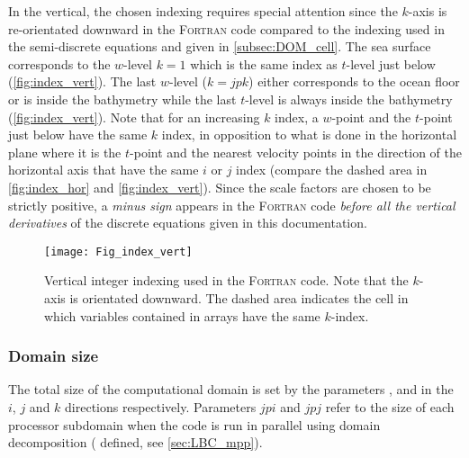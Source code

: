 \documentclass[../tex_main/NEMO_manual]{subfiles}
\begin{document}
In the vertical, the chosen indexing requires special attention since the 
$k$-axis is re-orientated downward in the \textsc{Fortran} code compared 
to the indexing used in the semi-discrete equations and given in \autoref{subsec:DOM_cell}. 
The sea surface corresponds to the $w$-level $k=1$ which is the same index 
as $t$-level just below (\autoref{fig:index_vert}). The last $w$-level ($k=jpk$) 
either corresponds to the ocean floor or is inside the bathymetry while the last 
$t$-level is always inside the bathymetry (\autoref{fig:index_vert}). Note that 
for an increasing $k$ index, a $w$-point and the $t$-point just below have the 
same $k$ index, in opposition to what is done in the horizontal plane where 
it is the $t$-point and the nearest velocity points in the direction of the horizontal 
axis that have the same $i$ or $j$ index (compare the dashed area in 
\autoref{fig:index_hor} and \autoref{fig:index_vert}). Since the scale factors are 
chosen to be strictly positive, a \emph{minus sign} appears in the \textsc{Fortran} 
code \emph{before all the vertical derivatives} of the discrete equations given in 
this documentation.

\begin{figure}[!pt]    \begin{center}
\texttt{[image: Fig\_index\_vert]}
\caption{ \protect\label{fig:index_vert}     
Vertical integer indexing used in the \textsc{Fortran } code. Note that 
the $k$-axis is orientated downward. The dashed area indicates the cell in 
which variables contained in arrays have the same $k$-index.}
\end{center}   \end{figure}

\subsubsection{Domain size}
\label{subsec:DOM_size}

The total size of the computational domain is set by the parameters , 
 and  in the $i$, $j$ and $k$ directions respectively. 
Parameters $jpi$ and $jpj$ refer to the size of each processor subdomain when the code is 
run in parallel using domain decomposition ( defined, see \autoref{sec:LBC_mpp}).


$\ $\newline    %
\end{document}

